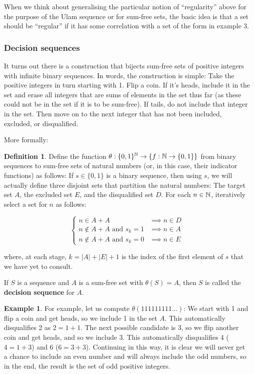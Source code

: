 \documentclass{article}
\theoremstyle{definition}
\newtheorem{definition}{Definition}
\newtheorem{example}{Example}
\theoremstyle{remark}
\numberwithin{equation}{section}
\begin{document}
When we think about generalising the particular notion of
``regularity'' above for the purpose of the Ulam sequence or for
sum-free sets, the basic idea is that a set should be ``regular'' if
it has some correlation with a set of the form in example 3.

\subsubsection{Decision sequences}

It turns out there is a construction that bijects sum-free sets of
positive integers with infinite binary sequences.  In words, the
construction is simple: Take the positive integers in turn starting
with 1.  Flip a coin.  If it's heads, include it in the set and erase
all integers that are sums of elements in the set thus far (as these
could not be in the set if it is to be sum-free).  If tails, do not
include that integer in the set.  Then move on to the next integer
that has not been included, excluded, or disqualified.

More formally: 

\begin{definition}Define the function
  $\theta : \{0,1\}^{\mathbb{N}} \to \{f : \mathbb{N} \to \{0,1\}\}$ from binary
  sequences to sum-free sets of natural numbers (or, in this case,
  their indicator functions) as follows: If $s\in\{0,1\}$ is a binary
  sequence, then using $s$, we will actually define three disjoint
  sets that partition the natural numbers: The target set $A$, the
  excluded set $E$, and the disqualified set $D$.  For each
  $n \in \mathbb{N}$, iteratively select a set for $n$ as follows:

\[\begin{cases}
n \in A+A &\implies n \in D\\
n \notin A+A \text{ and } s_k = 1 &\implies n \in A\\
n \notin A+A \text{ and } s_k = 0 &\implies n \in E
\end{cases}\]

where, at each stage, $k = |A|+|E|+1$ is the index of the first
element of $s$ that we have yet to consult. 

If $S$ is a sequence and $A$ is a sum-free set with $\theta(S) = A$,
then $S$ is called the \textbf{decision sequence} for $A$.
\end{definition}

\begin{example}
  For example, let us compute $\theta(111111111...)$: We start with 1
  and flip a coin and get heads, so we include 1 in the set $A$.  This
  automatically disqualifies 2 as $2 = 1+1$.  The next possible
  candidate is 3, so we flip another coin and get heads, and so we
  include 3.  This automatically disqualifies 4 ($4 = 1+3$) and 6
  ($6 = 3+3$).  Continuing in this way, it is clear we will never get
  a chance to include an even number and will always include the odd
  numbers, so in the end, the result is the set of odd positive
  integers.
\end{example}
\end{document}
